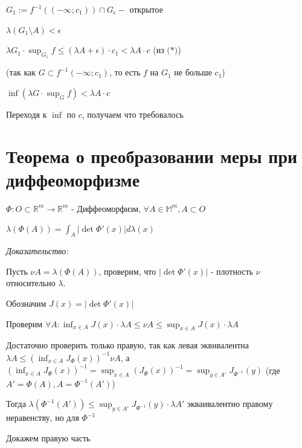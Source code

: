 \documentclass[paper=a4, fontsize=17pt]{article}
\begin{document}
\begin{enumerate}
	$G_1 := f^{-1}((- \infty; c_1)) \cap G_{\epsilon} - $ открытое

	$\lambda(G_1 \setminus A) < \epsilon$

	$\lambda G_1 \cdot \sup_{G_1} f \leqslant (\lambda A + \epsilon) \cdot c_1 < \lambda A \cdot c$ (из $\textbf{(*)}$)

	(так как $G \subset f^{-1}(- \infty; c_1)$, то есть $f$ на $G_1$ не больше $c_1$)

	$\inf(\lambda G \cdot \sup_G f) < \lambda A \cdot c$

	Переходя к $\inf$ по $c$, получаем что требовалось
\end{enumerate}

\section{Теорема о преобразовании меры при диффеоморфизме}
$\Phi: O \subset \mathds{R}^m \rightarrow \mathds{R}^m$ - Диффеоморфизм, $\forall A \in \mathds{M}^m, A \subset O$

$\lambda(\Phi(A)) = \int_A |\det \Phi' (x)| d \lambda(x)$

\emph{Доказательство:}

Пусть $\nu A = \lambda(\Phi(A))$, проверим, что $|\det \Phi' (x)|$ - плотность $\nu$ относительно $\lambda$.

Обозначим $J(x) = |\det \Phi' (x)|$

Проверим $\forall A: \inf_{x \in A} J(x) \cdot \lambda A \leqslant \nu A \leqslant \sup_{x \in A} J(x) \cdot \lambda A$

Достаточно проверить только правую, так как левая эквивалентна $\lambda A \leqslant (\inf_{x \in A} J_{\Phi}(x))^{-1} \nu A$, а $(\inf_{x \in A} J_{\Phi}(x))^{-1} = \sup_{x \in A} (J_{\Phi}(x))^{-1} = \sup_{y \in A'} J_{\Phi^{-1}}(y)$ (где $A' = \Phi(A), A = \Phi^{-1}(A')$)

Тогда $\lambda(\Phi^{-1}(A')) \leqslant \sup_{y \in A'} J_{\Phi^{-1}}(y) \cdot \lambda A'$ экваивалентно правому неравенству, но для $\Phi^{-1}$

Докажем правую часть
\end{document}

